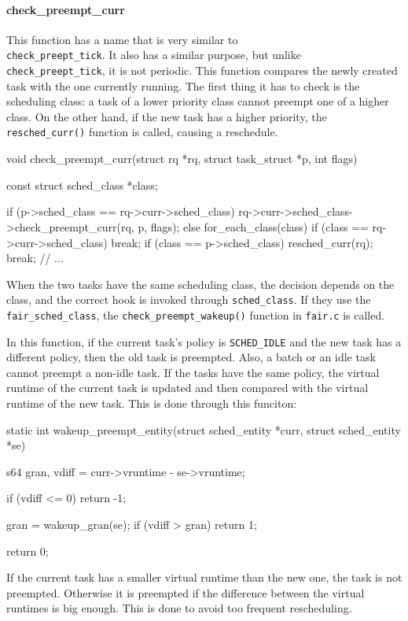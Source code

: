 \paragraph{check\_preempt\_curr}\label{check_preempt_curr}
This function has a name that is very similar to\\ \verb|check_preept_tick|. It also has a similar purpose, but unlike \verb|check_preept_tick|, it is not periodic.
This function compares the newly created task with the one currently running. The first thing it has to check is the scheduling class: a task of a lower priority class cannot preempt one of a higher class. On the other hand, if the new task has a higher priority, the \verb|resched_curr()| function is called, causing a reschedule.
\begin{code}
void check_preempt_curr(struct rq *rq, struct task_struct *p, int flags)
{
	const struct sched_class *class;

	if (p->sched_class == rq->curr->sched_class) {
		rq->curr->sched_class->check_preempt_curr(rq, p, flags);
	} else {
		for_each_class(class) {
			if (class == rq->curr->sched_class)
				break;
			if (class == p->sched_class) {
				resched_curr(rq);
				break;
			}
		}
	}
	// ...
}
\end{code}
When the two tasks have the same scheduling class, the decision depends on the class, and the correct hook is invoked through \verb|sched_class|. If they use the \verb|fair_sched_class|, the \verb|check_preempt_wakeup()| function in \verb|fair.c| is called.

In this function, if the current task's policy is \verb|SCHED_IDLE| and the new task has a different policy, then the old task is preempted. Also, a batch or an idle task cannot preempt a non-idle task. If the tasks have the same policy, the virtual runtime of the current task is updated and then compared with the virtual runtime of the new task. This is done through this funciton:

\begin{code}
static int
wakeup_preempt_entity(struct sched_entity *curr, struct sched_entity *se)
{
	s64 gran, vdiff = curr->vruntime - se->vruntime;

	if (vdiff <= 0)
		return -1;

	gran = wakeup_gran(se);
	if (vdiff > gran)
		return 1;

	return 0;
}
\end{code}
If the current task has a smaller virtual runtime than the new one, the task is not preempted. Otherwise it is preempted if the difference between the virtual runtimes is big enough. This is done to avoid too frequent rescheduling. 

